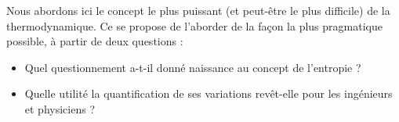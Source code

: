 Nous abordons ici le concept le plus puissant (et peut-être le plus difficile) de la thermodynamique. Ce \courshuit se propose de l’aborder de la façon la plus pragmatique possible, à partir de deux questions :
\begin{itemize}
	\item Quel questionnement a-t-il donné naissance au concept de l’entropie ?
	\item Quelle utilité la quantification de ses variations revêt-elle pour les ingénieurs et physiciens ?
\end{itemize}
